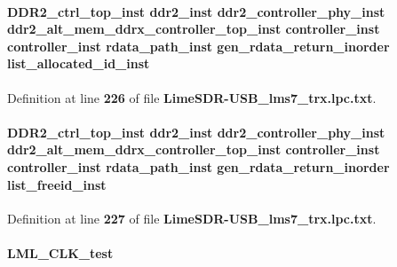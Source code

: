 \paragraph[{list\+\_\+allocated\+\_\+id\+\_\+inst}]{ {\bf D\+D\+R2\+\_\+ctrl\+\_\+top\+\_\+inst} {\bf ddr2\+\_\+inst} {\bf ddr2\+\_\+controller\+\_\+phy\+\_\+inst} {\bf ddr2\+\_\+alt\+\_\+mem\+\_\+ddrx\+\_\+controller\+\_\+top\+\_\+inst} {\bf controller\+\_\+inst} {\bf controller\+\_\+inst} {\bf rdata\+\_\+path\+\_\+inst} gen\+\_\+rdata\+\_\+return\+\_\+inorder list\+\_\+allocated\+\_\+id\+\_\+inst}\label{LimeSDR-USB__lms7__trx_8lpc_8txt_ac33daa87a691e7a372cbfe99bdfa7c1e}


Definition at line {\bf 226} of file {\bf Lime\+S\+D\+R-\/\+U\+S\+B\+\_\+lms7\+\_\+trx.\+lpc.\+txt}.

\paragraph[{list\+\_\+freeid\+\_\+inst}]{ {\bf D\+D\+R2\+\_\+ctrl\+\_\+top\+\_\+inst} {\bf ddr2\+\_\+inst} {\bf ddr2\+\_\+controller\+\_\+phy\+\_\+inst} {\bf ddr2\+\_\+alt\+\_\+mem\+\_\+ddrx\+\_\+controller\+\_\+top\+\_\+inst} {\bf controller\+\_\+inst} {\bf controller\+\_\+inst} {\bf rdata\+\_\+path\+\_\+inst} gen\+\_\+rdata\+\_\+return\+\_\+inorder list\+\_\+freeid\+\_\+inst}\label{LimeSDR-USB__lms7__trx_8lpc_8txt_a77f8c5b963d2adbc7a11340db3b15ae0}


Definition at line {\bf 227} of file {\bf Lime\+S\+D\+R-\/\+U\+S\+B\+\_\+lms7\+\_\+trx.\+lpc.\+txt}.

\paragraph[{L\+M\+L\+\_\+\+C\+L\+K\+\_\+test}]{ L\+M\+L\+\_\+\+C\+L\+K\+\_\+test}\label{LimeSDR-USB__lms7__trx_8lpc_8txt_a43f1272447061375e60c8645eef2cdb4}


